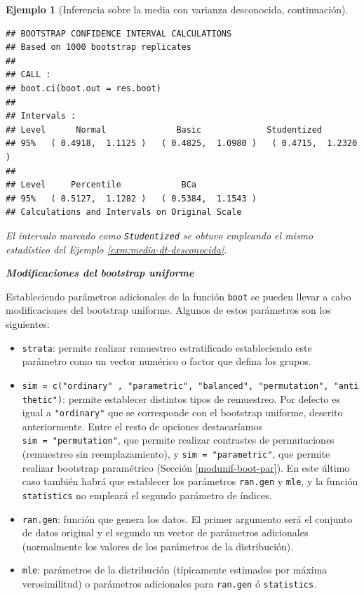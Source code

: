 \documentclass[
]{book}
\theoremstyle{break}
\newtheorem{example}{Ejemplo}[chapter]
\theoremstyle{nonumberplain}
\begin{document}
\begin{example}[Inferencia sobre la media con varianza desconocida, continuación]
\begin{verbatim}
## BOOTSTRAP CONFIDENCE INTERVAL CALCULATIONS
## Based on 1000 bootstrap replicates
## 
## CALL : 
## boot.ci(boot.out = res.boot)
## 
## Intervals : 
## Level      Normal              Basic             Studentized     
## 95%   ( 0.4918,  1.1125 )   ( 0.4825,  1.0980 )   ( 0.4715,  1.2320 )  
## 
## Level     Percentile            BCa          
## 95%   ( 0.5127,  1.1282 )   ( 0.5384,  1.1543 )  
## Calculations and Intervals on Original Scale
\end{verbatim}

El intervalo marcado como \texttt{Studentized} se obtuvo empleando el mismo estadístico
del Ejemplo \ref{exm:media-dt-desconocida}.
\end{example}

\textbf{\emph{Modificaciones del bootstrap uniforme}}

Estableciendo parámetros adicionales de la función \texttt{boot} se pueden llevar
a cabo modificaciones del bootstrap uniforme.
Algunos de estos parámetros son los siguientes:

\begin{itemize}
\item
  \texttt{strata}: permite realizar remuestreo estratificado estableciendo este parámetro
  como un vector numérico o factor que defina los grupos.
\item
  \texttt{sim\ =\ c("ordinary"\ ,\ "parametric",\ "balanced",\ "permutation",\ "antithetic")}:
  permite establecer distintos tipos de remuestreo.
  Por defecto es igual a \texttt{"ordinary"} que se corresponde con el bootstrap uniforme,
  descrito anteriormente. Entre el resto de opciones destacaríamos
  \texttt{sim\ =\ "permutation"}, que permite realizar contrastes de
  permutaciones (remuestreo sin reemplazamiento), y \texttt{sim\ =\ "parametric"},
  que permite realizar bootstrap paramétrico (Sección \ref{modunif-boot-par}).
  En este último caso también habrá que establecer los parámetros \texttt{ran.gen} y
  \texttt{mle}, y la función \texttt{statistics} no empleará el segundo parámetro de índices.
\item
  \texttt{ran.gen}: función que genera los datos. El primer argumento será el conjunto de datos
  original y el segundo un vector de parámetros adicionales
  (normalmente los valores de los parámetros de la distribución).
\item
  \texttt{mle}: parámetros de la distribución (típicamente estimados por máxima verosimilitud)
  o parámetros adicionales para \texttt{ran.gen} ó \texttt{statistics}.
\end{itemize}
\end{document}
